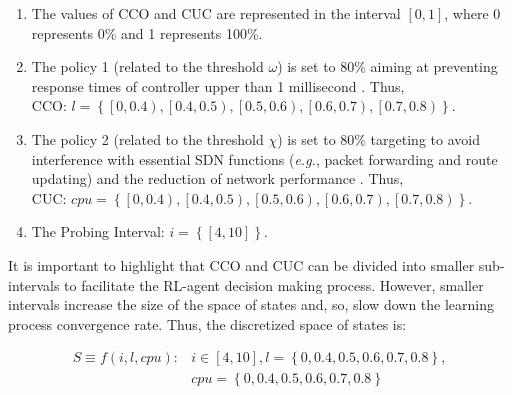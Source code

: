 \begin{enumerate}
    \item The values of CCO and CUC are represented in the interval $\left [ 0,1 \right ]$, where 0 represents 0\% and 1 represents 100\%.
    \item The policy 1 (related to the threshold $\omega$) is set to 80\% aiming at preventing response times of controller upper than 1 millisecond \cite{repas_2015:performance_cpu}. Thus, \\
    CCO: $ l =\left \{ \left [ 0,0.4 \right ), \left [ 0.4,0.5 \right ), \left [ 0.5,0.6 \right ), \left [ 0.6,0.7 \right ) ,\left [ 0.7,0.8 \right )\right \}$.
    \item The policy 2 (related to the threshold $\chi$) is set to 80\% targeting to avoid interference with essential SDN functions (\textit{e.g.}, packet forwarding and route updating) and the reduction of network performance \cite{xu_2017:wildcard_requests}. Thus, \\
    CUC: $cpu=\left \{ \left [ 0,0.4 \right ),\left [ 0.4,0.5 \right ),\left [ 0.5,0.6 \right ),\left [ 0.6,0.7 \right ),\left [ 0.7,0.8 \right ) \right \}$.
    \item The Probing Interval: $i = \left \{\left [ 4,10 \right ] \right \}$. 
\end{enumerate}

It is important to highlight that CCO and CUC can be divided into smaller sub-intervals to facilitate the RL-agent decision making process. However, smaller intervals increase the size of the space of states and, so, slow down the learning process convergence rate. Thus, the discretized space of states is:

{\setlength{\mathindent}{3cm}
\begin{equation}
    \begin{split}
      S\equiv f\left ( i, l, cpu \right ): & i\in \left [ 4,10 \right ], l=\left \{ 0,0.4,0.5,0.6,0.7,0.8 \right \},\\ 
      & cpu=\left \{ 0,0.4,0.5,0.6,0.7,0.8 \right \} 
    \end{split}
    \label{equ:states}
\end{equation}
}